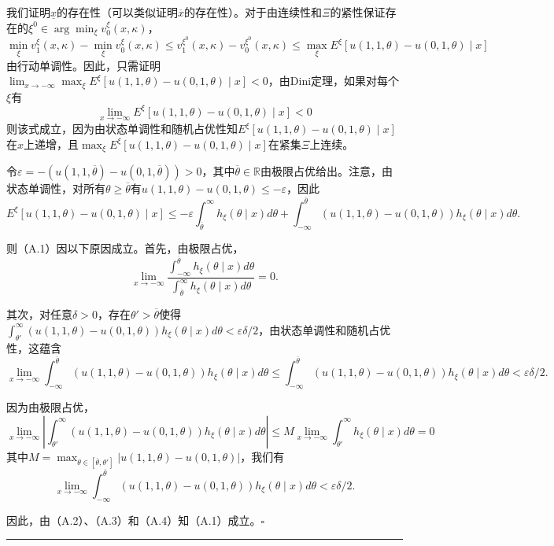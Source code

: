 \documentclass[12pt,a4paper]{article}
\newenvironment{translation}
  {\par\noindent\color{darkblue}\ignorespaces}
  {\par\medskip\noindent\hrule\par\medskip}
\theoremstyle{definition}
\theoremstyle{remark}
\begin{document}
\begin{translation}
我们证明$\underline{x}$的存在性（可以类似证明$\overline{x}$的存在性）。对于由连续性和$\Xi$的紧性保证存在的$\xi^0 \in \arg\min_{\xi} v_0^\xi(x, \kappa)$，
\[
\min_{\xi} v_1^\xi(x, \kappa) - \min_{\xi} v_0^\xi(x, \kappa) \le v_1^{\xi^0}(x, \kappa) - v_0^{\xi^0}(x, \kappa) \le \max_{\xi} E^\xi[u(1, 1, \theta) - u(0, 1, \theta) \mid x]
\]
由行动单调性。因此，只需证明$\lim_{x \to -\infty} \max_{\xi} E^\xi[u(1, 1, \theta) - u(0, 1, \theta) \mid x] < 0$，由Dini定理，如果对每个$\xi$有
\[
\lim_{x \to -\infty} E^\xi[u(1, 1, \theta) - u(0, 1, \theta) \mid x] < 0
\tag{A.1}
\]
则该式成立，因为由状态单调性和随机占优性知$E^\xi[u(1, 1, \theta) - u(0, 1, \theta) \mid x]$在$x$上递增，且$\max_{\xi} E^\xi[u(1, 1, \theta) - u(0, 1, \theta) \mid x]$在紧集$\Xi$上连续。

令$\varepsilon = -(u(1, 1, \overline{\theta}) - u(0, 1, \overline{\theta})) > 0$，其中$\overline{\theta} \in \mathbb{R}$由极限占优给出。注意，由状态单调性，对所有$\theta \ge \overline{\theta}$有$u(1, 1, \theta) - u(0, 1, \theta) \le -\varepsilon$，因此
\[
E^\xi[u(1, 1, \theta) - u(0, 1, \theta) \mid x] \le -\varepsilon \int_{\overline{\theta}}^{\infty} h_\xi(\theta \mid x) d\theta + \int_{-\infty}^{\overline{\theta}} (u(1, 1, \theta) - u(0, 1, \theta)) h_\xi(\theta \mid x) d\theta.
\tag{A.2}
\]

则（A.1）因以下原因成立。首先，由极限占优，
\[
\lim_{x \to -\infty} \frac{\int_{-\infty}^{\overline{\theta}} h_\xi(\theta \mid x) d\theta}{\int_{\overline{\theta}}^{\infty} h_\xi(\theta \mid x) d\theta} = 0.
\tag{A.3}
\]

其次，对任意$\delta > 0$，存在$\theta' > \overline{\theta}$使得$\int_{\theta'}^{\infty} (u(1, 1, \theta) - u(0, 1, \theta)) h_\xi(\theta \mid x) d\theta < \varepsilon\delta/2$，由状态单调性和随机占优性，这蕴含
\[
\lim_{x \to -\infty} \int_{-\infty}^{\overline{\theta}} (u(1, 1, \theta) - u(0, 1, \theta)) h_\xi(\theta \mid x) d\theta \le \int_{-\infty}^{\overline{\theta}} (u(1, 1, \theta) - u(0, 1, \theta)) h_\xi(\theta \mid x) d\theta < \varepsilon\delta/2.
\]

因为由极限占优，
\[
\lim_{x \to -\infty} \left| \int_{\theta'}^{\infty} (u(1, 1, \theta) - u(0, 1, \theta)) h_\xi(\theta \mid x) d\theta \right| \le M \lim_{x \to -\infty} \int_{\theta'}^{\infty} h_\xi(\theta \mid x) d\theta = 0
\]
其中$M = \max_{\theta \in [\overline{\theta}, \theta']} |u(1, 1, \theta) - u(0, 1, \theta)|$，我们有
\[
\lim_{x \to -\infty} \int_{-\infty}^{\overline{\theta}} (u(1, 1, \theta) - u(0, 1, \theta)) h_\xi(\theta \mid x) d\theta < \varepsilon\delta/2.
\tag{A.4}
\]

因此，由（A.2）、（A.3）和（A.4）知（A.1）成立。$\square$
\end{translation}
\end{document}
